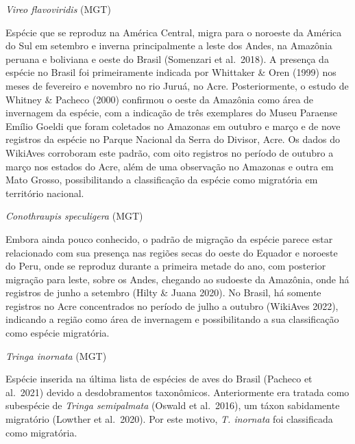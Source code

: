 \documentclass[
  oneside]{scrbook}
\begin{document}
\begin{blackbox}
\emph{Vireo flavoviridis} (MGT)

Espécie que se reproduz na América Central, migra para o noroeste da América do Sul em setembro e inverna principalmente a leste dos Andes, na Amazônia peruana e boliviana e oeste do Brasil (Somenzari et al.~2018). A presença da espécie no Brasil foi primeiramente indicada por Whittaker \& Oren (1999) nos meses de fevereiro e novembro no rio Juruá, no Acre. Posteriormente, o estudo de Whitney \& Pacheco (2000) confirmou o oeste da Amazônia como área de invernagem da espécie, com a indicação de três exemplares do Museu Paraense Emílio Goeldi que foram coletados no Amazonas em outubro e março e de nove registros da espécie no Parque Nacional da Serra do Divisor, Acre. Os dados do WikiAves corroboram este padrão, com oito registros no período de outubro a março nos estados do Acre, além de uma observação no Amazonas e outra em Mato Grosso, possibilitando a classificação da espécie como migratória em território nacional.

\end{blackbox}

\begin{blackbox}
\emph{Conothraupis speculigera} (MGT)

Embora ainda pouco conhecido, o padrão de migração da espécie parece estar relacionado com sua presença nas regiões secas do oeste do Equador e noroeste do Peru, onde se reproduz durante a primeira metade do ano, com posterior migração para leste, sobre os Andes, chegando ao sudoeste da Amazônia, onde há registros de junho a setembro (Hilty \& Juana 2020). No Brasil, há somente registros no Acre concentrados no período de julho a outubro (WikiAves 2022), indicando a região como área de invernagem e possibilitando a sua classificação como espécie migratória.

\end{blackbox}

\begin{blackbox}
\emph{Tringa inornata} (MGT)

Espécie inserida na última lista de espécies de aves do Brasil (Pacheco et al.~2021) devido a desdobramentos taxonômicos. Anteriormente era tratada como subespécie de \emph{Tringa semipalmata} (Oswald et al.~2016), um táxon sabidamente migratório (Lowther et al.~2020). Por este motivo, \emph{T. inornata} foi classificada como migratória.

\end{blackbox}
\end{document}
